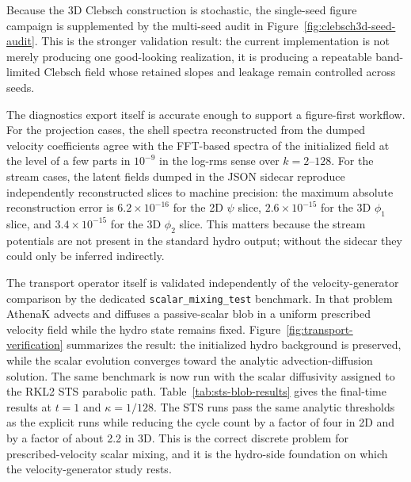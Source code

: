 \documentclass[twocolumn]{aastex7}
\newcommand{\code}[1]{\texttt{#1}}
\begin{document}
Because the 3D Clebsch construction is stochastic, the single-seed figure
campaign is supplemented by the multi-seed audit in
Figure~\ref{fig:clebsch3d-seed-audit}. This is the stronger validation result:
the current implementation is not merely producing one good-looking
realization, it is producing a repeatable band-limited Clebsch field whose
retained slopes and leakage remain controlled across seeds.

The diagnostics export itself is accurate enough to support a figure-first workflow. For the projection cases, the shell spectra reconstructed from the dumped velocity coefficients agree with the FFT-based spectra of the initialized field at the level of a few parts in $10^{-9}$ in the log-rms sense over $k=2$--$128$. For the stream cases, the latent fields dumped in the JSON sidecar reproduce independently reconstructed slices to machine precision: the maximum absolute reconstruction error is $6.2\times10^{-16}$ for the 2D $\psi$ slice, $2.6\times10^{-15}$ for the 3D $\phi_1$ slice, and $3.4\times10^{-15}$ for the 3D $\phi_2$ slice. This matters because the stream potentials are not present in the standard hydro output; without the sidecar they could only be inferred indirectly.

The transport operator itself is validated independently of the velocity-generator comparison by the dedicated \code{scalar\_mixing\_test} benchmark. In that problem AthenaK advects and diffuses a passive-scalar blob in a uniform prescribed velocity field while the hydro state remains fixed. Figure~\ref{fig:transport-verification} summarizes the result: the initialized hydro background is preserved, while the scalar evolution converges toward the analytic advection-diffusion solution. The same benchmark is now run with the scalar diffusivity assigned to the RKL2 STS parabolic path. Table~\ref{tab:sts-blob-results} gives the final-time results at $t=1$ and $\kappa=1/128$. The STS runs pass the same analytic thresholds as the explicit runs while reducing the cycle count by a factor of four in 2D and by a factor of about 2.2 in 3D. This is the correct discrete problem for prescribed-velocity scalar mixing, and it is the hydro-side foundation on which the velocity-generator study rests.
\end{document}
